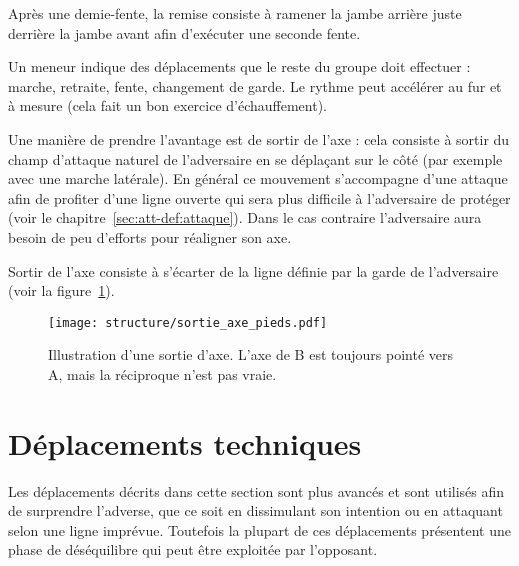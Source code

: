 \begin{definition}

Après une demie-fente, la remise consiste à ramener la jambe arrière juste derrière la jambe avant afin d'exécuter une seconde fente.
\end{definition}


\begin{exercice}

Un meneur indique des déplacements que le reste du groupe doit effectuer : marche, retraite, fente, changement de garde.
Le rythme peut accélérer au fur et à mesure (cela fait un bon exercice d'échauffement).
\end{exercice}


Une manière de prendre l'avantage est de sortir de l'axe : cela consiste à sortir du champ d'attaque naturel de l'adversaire en se déplaçant sur le côté (par exemple avec une marche latérale).
En général ce mouvement s'accompagne d'une attaque afin de profiter d'une ligne ouverte qui sera plus difficile à l'adversaire de protéger (voir le chapitre~\ref{sec:att-def:attaque}).
Dans le cas contraire l'adversaire aura besoin de peu d'efforts pour réaligner son axe.


\begin{definition}
\label{dep:def:sortie-axe}

Sortir de l'axe consiste à s'écarter de la ligne définie par la garde de l'adversaire (voir la figure~\ref{def:fig:sortie-garde}).
\end{definition}


\begin{figure}[ht]
	\centering
	\texttt{[image: structure/sortie\_axe\_pieds.pdf]}
	\caption{Illustration d'une sortie d'axe.
	L'axe de B est toujours pointé vers A, mais la réciproque n'est pas vraie.}
	\label{def:fig:sortie-garde}
\end{figure}


\section{Déplacements techniques}


Les déplacements décrits dans cette section sont plus avancés et sont utilisés afin de surprendre l'adverse, que ce soit en dissimulant son intention ou en attaquant selon une ligne imprévue.
Toutefois la plupart de ces déplacements présentent une phase de déséquilibre qui peut être exploitée par l'opposant.

